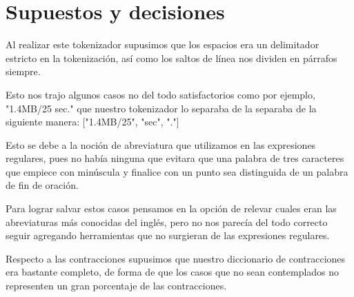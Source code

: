 \section{Supuestos y decisiones}

Al realizar este tokenizador supusimos que los espacios era un delimitador estricto en la tokenizaci\'on, as\'i como los saltos de l\'inea nos dividen en p\'arrafos siempre. 

Esto nos trajo algunos casos no del todo satisfactorios como por ejemplo, "1.4MB/25 sec." que nuestro tokenizador lo separaba de la separaba de la siguiente manera: ["1.4MB/25", "sec", "."] 

Esto se debe a la noci\'on de abreviatura que utilizamos en las expresiones regulares, pues no hab\'ia ninguna que evitara que una palabra de tres caracteres que empiece con min\'uscula y finalice con un punto sea distinguida de un palabra de fin de oraci\'on. 

Para lograr salvar estos casos pensamos en la opci\'on de relevar cuales eran las abreviaturas m\'as conocidas del ingl\'es, pero no nos parec\'ia del todo correcto seguir agregando herramientas que no surgieran de las expresiones regulares. 

Respecto a las contracciones supusimos que nuestro diccionario de contracciones era bastante completo, de forma de que los casos que no sean contemplados no representen un gran porcentaje de las contracciones.